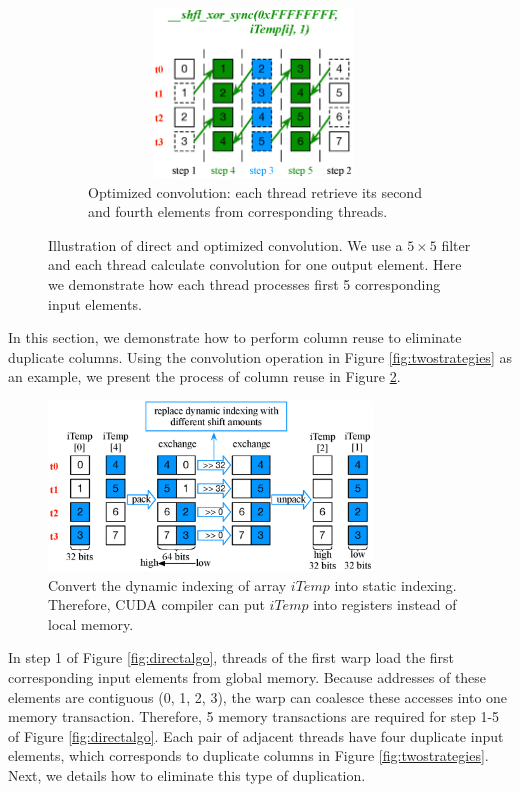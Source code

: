 \begin{figure}
\begin{subfigure}{0.3\textwidth}
		 \includegraphics[width=0.96\textwidth,height=4.5cm]{./figure/optalgo2.eps}
		 \caption{Optimized convolution: each thread retrieve its second and fourth elements from corresponding threads.}
		 \label{fig:optalgo2}
	\end{subfigure}
  \caption{Illustration of direct and optimized convolution. We use a $5 \times 5$ filter  and each thread calculate convolution for one output element. Here we demonstrate how each thread processes first 5 corresponding input elements.}
   \label{fig:corealgo}
\end{figure}

In this section, we demonstrate how to perform column reuse to eliminate duplicate columns. Using the convolution operation in Figure \ref{fig:twostrategies} as an example, we present the process of column reuse in Figure \ref{fig:corealgo}.%

\begin{figure}
	\centering
	\includegraphics[width=\columnwidth,height=4.5cm]{./figure/exchange.eps}
\caption{Convert the dynamic indexing of array $iTemp$ into static indexing. Therefore, CUDA compiler can put $iTemp$ into registers instead of local memory.}
\label{fig:exchange}
\end{figure}


In step 1 of Figure \ref{fig:directalgo}, threads of the first warp load the first corresponding input elements from global memory. Because
addresses of these elements are contiguous (0, 1, 2, 3), the warp can coalesce these accesses into one memory transaction. Therefore, 5
memory transactions are required for step 1-5 of Figure \ref{fig:directalgo}. Each pair of adjacent threads have four duplicate input
elements, which corresponds to duplicate columns in Figure \ref{fig:twostrategies}. Next, we details how to eliminate this type of
duplication.

